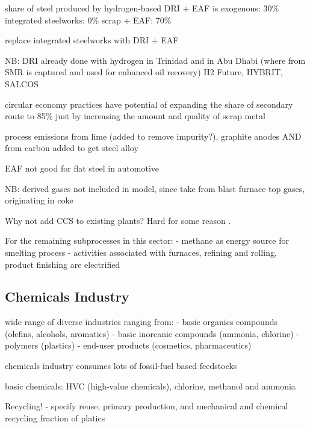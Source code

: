 share of steel produced by hydrogen-based DRI + EAF is exogenous: 30\%
integrated steelworks: 0\%
scrap + EAF: 70\%

replace integrated steelworks with DRI + EAF

NB: DRI already done with hydrogen in Trinidad and in Abu Dhabi (where \co from
SMR is captured and used for enhanced oil recovery) H2 Future, HYBRIT, SALCOS

 circular economy practices have potential of expanding
the share of secondary route to 85\% just by increasing the amount and quality of scrap metal

process emissions from lime (added to remove impurity?), graphite anodes AND
from carbon added to get steel alloy  

EAF not good for flat steel in automotive

NB: derived gases not included in model, since take from blast furnace top
gases, originating in coke

Why not add CCS to existing plants? Hard for some reason .

For the remaining subprocesses in this sector:
- methane as energy source for smelting process
- activities associated with furnaces, refining and rolling, product finishing are electrified

\subsection{Chemicals Industry}


wide range of diverse industries ranging from:
- basic organics compounds (olefins, alcohols, aromatics)
- basic inorcanic compounds (ammonia, chlorine)
- polymers (plastics)
- end-user products (cosmetics, pharmaceutics)

chemicals industry consumes lots of fossil-fuel based feedstocks 

basic chemicals: HVC (high-value chemicals), chlorine, methanol and ammonia

Recycling!
- specify reuse, primary production, and mechanical and chemical recycling
fraction of platics

